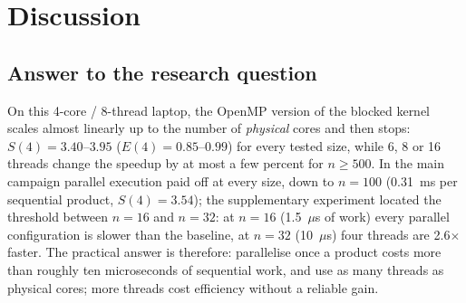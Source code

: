 \section{Discussion}
\subsection{Answer to the research question}
On this 4-core / 8-thread laptop, the OpenMP version of the blocked kernel scales almost linearly up to the number of \emph{physical} cores
and then stops: $S(4)=3.40$--$3.95$ ($E(4)=0.85$--$0.99$) for every tested size, while 6, 8 or 16 threads change the speedup by at most a few
percent for $n\ge500$. In the main campaign parallel execution paid off at every size, down to $n=100$ (0.31~ms per sequential product, $S(4)=3.54$); the
supplementary experiment located the threshold between $n=16$ and $n=32$: at $n=16$ (1.5~$\mu$s of work) every parallel configuration is slower
than the baseline, at $n=32$ (10~$\mu$s) four threads are 2.6$\times$ faster. The practical answer is therefore: parallelise once a product
costs more than roughly ten microseconds of sequential work, and use as many threads as physical cores; more threads cost efficiency without a
reliable gain.


